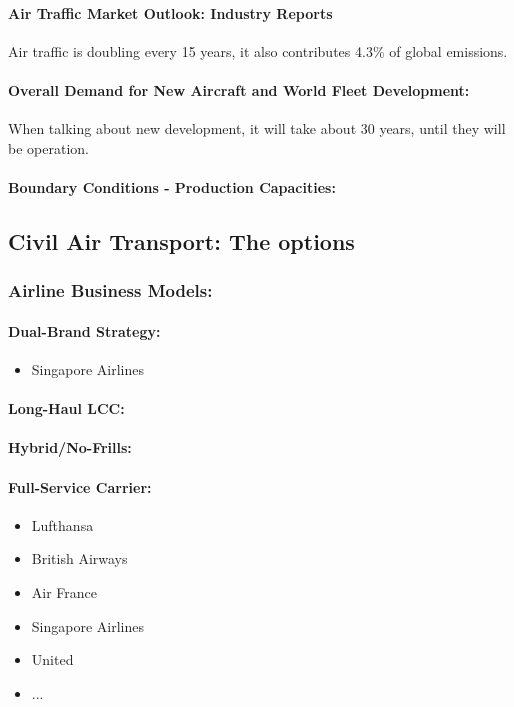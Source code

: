 \documentclass[twocolumn]{article}
\begin{document}
		\paragraph{Air Traffic Market Outlook: Industry Reports}
			Air traffic is doubling every 15 years, it also contributes 4.3\% of global emissions.
		\paragraph{Overall Demand for New Aircraft and World Fleet Development:}
			When talking about new development, it will take about 30 years, until they will be operation.
		\paragraph{Boundary Conditions - Production Capacities:}

	\subsection{Civil Air Transport: The options}
		\subsubsection{Airline Business Models:}
			\paragraph{Dual-Brand Strategy:}
				\begin{itemize}
				\item Singapore Airlines
				\end{itemize}
			\paragraph{Long-Haul LCC:}
			\paragraph{Hybrid/No-Frills:}

			\paragraph{Full-Service Carrier:}
				\begin{itemize}
				\item Lufthansa
				\item British Airways
				\item Air France
				\item Singapore Airlines
				\item United
				\item ...
				\end{itemize}
\end{document}

